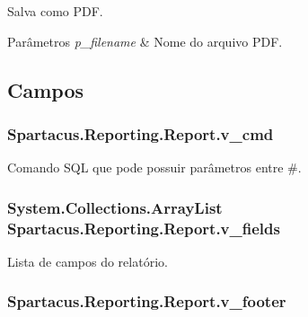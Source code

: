 Salva como P\+D\+F. 


\begin{DoxyParams}{Parâmetros}
{\em p\+\_\+filename} & Nome do arquivo P\+D\+F.\\
\hline
\end{DoxyParams}


\subsection{Campos}
\hypertarget{classSpartacus_1_1Reporting_1_1Report_a35359a3acb53db8d3265e3d6497124f2}{
\subsubsection[{v\+\_\+cmd}]{ Spartacus.\+Reporting.\+Report.\+v\+\_\+cmd}}\label{classSpartacus_1_1Reporting_1_1Report_a35359a3acb53db8d3265e3d6497124f2}


Comando S\+Q\+L que pode possuir parâmetros entre \#. 

\hypertarget{classSpartacus_1_1Reporting_1_1Report_ac73ca7687d2e6b5f5281a05a2131d0bf}{
\subsubsection[{v\+\_\+fields}]{\setlength{\rightskip}{0pt plus 5cm}System.\+Collections.\+Array\+List Spartacus.\+Reporting.\+Report.\+v\+\_\+fields}}\label{classSpartacus_1_1Reporting_1_1Report_ac73ca7687d2e6b5f5281a05a2131d0bf}


Lista de campos do relatório. 

\hypertarget{classSpartacus_1_1Reporting_1_1Report_ac5b8fc2e637f71f965ef27fbdbdd9acf}{
\subsubsection[{v\+\_\+footer}]{ Spartacus.\+Reporting.\+Report.\+v\+\_\+footer}}\label{classSpartacus_1_1Reporting_1_1Report_ac5b8fc2e637f71f965ef27fbdbdd9acf}


